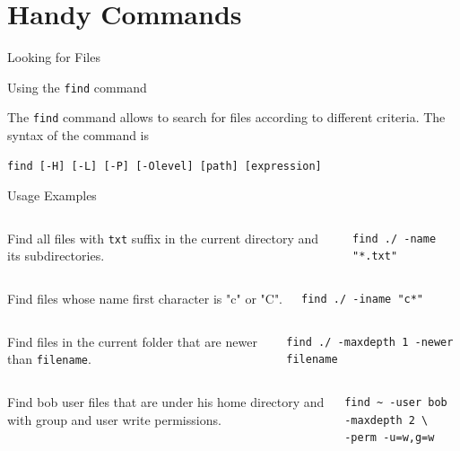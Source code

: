 \section{Handy Commands}
\begin{frame}[t,fragile]{Looking for Files}

  \vspace{-0.3cm}
  \begin{block}{Using the \alert{\texttt{find}} command}
    {\footnotesize
The \alert{\texttt{find}} command allows to search for files according to different criteria. The syntax of the command is


        \begin{lstlisting}
find [-H] [-L] [-P] [-Olevel] [path] [expression]
        \end{lstlisting}

  Usage Examples
}


\vspace{0.1cm}
{\scriptsize
  \begin{columns}
      Find all files with \texttt{txt} suffix in the current directory and its subdirectories.
        \begin{lstlisting}
find ./ -name "*.txt"
        \end{lstlisting}
    \end{columns}
 \begin{columns}
      Find files whose name first character is "c" or "C".
        \begin{lstlisting}
find ./ -iname "c*"
        \end{lstlisting}
    \end{columns}
 \begin{columns}
      Find files in the current folder that are newer than \texttt{filename}.
        \begin{lstlisting}
find ./ -maxdepth 1 -newer filename
        \end{lstlisting}
    \end{columns}
 \begin{columns}
      Find bob user files that are under his home directory and with  group and user write permissions.
        \begin{lstlisting}
find ~ -user bob -maxdepth 2 \
-perm -u=w,g=w
        \end{lstlisting}
    \end{columns}
}  
  \end{block}
\end{frame}

